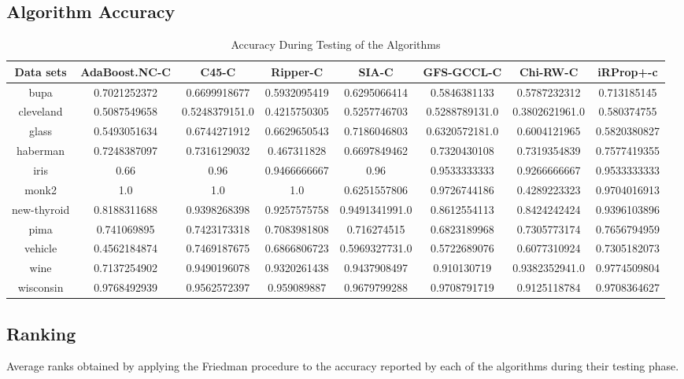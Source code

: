 \documentclass[a4paper,10pt]{article}
\begin{document}
\subsection {Algorithm Accuracy}
\begin {table}[!htp]
\caption {Accuracy During Testing of the Algorithms}
\centering
\begin{tiny}
\begin{tabular}{|c|c|c|c|c|c|c|c|}\hline
Data sets&AdaBoost.NC-C&C45-C&Ripper-C&SIA-C&GFS-GCCL-C&Chi-RW-C&iRProp+-c\\\hline
bupa&0.7021252372&0.6699918677&0.5932095419&0.6295066414&0.5846381133&0.5787232312&0.713185145\\
cleveland&0.5087549658&0.5248379151.0&0.4215750305&0.5257746703&0.5288789131.0&0.3802621961.0&0.580374755\\
glass&0.5493051634&0.6744271912&0.6629650543&0.7186046803&0.6320572181.0&0.6004121965&0.5820380827\\
haberman&0.7248387097&0.7316129032&0.467311828&0.6697849462&0.7320430108&0.7319354839&0.7577419355\\
iris&0.66&0.96&0.9466666667&0.96&0.9533333333&0.9266666667&0.9533333333\\
monk2&1.0&1.0&1.0&0.6251557806&0.9726744186&0.4289223323&0.9704016913\\
new-thyroid&0.8188311688&0.9398268398&0.9257575758&0.9491341991.0&0.8612554113&0.8424242424&0.9396103896\\
pima&0.741069895&0.7423173318&0.7083981808&0.716274515&0.6823189968&0.7305773174&0.7656794959\\
vehicle&0.4562184874&0.7469187675&0.6866806723&0.5969327731.0&0.5722689076&0.6077310924&0.7305182073\\
wine&0.7137254902&0.9490196078&0.9320261438&0.9437908497&0.910130719&0.9382352941.0&0.9774509804\\
wisconsin&0.9768492939&0.9562572397&0.959089887&0.9679799288&0.9708791719&0.9125118784&0.9708364627\\
\hline
\end{tabular}
\end{tiny}
\end{table}
\flushleft
\subsection {Ranking}
Average ranks obtained by applying the Friedman procedure to the accuracy reported by each of the algorithms during their testing phase.
\end{document}

